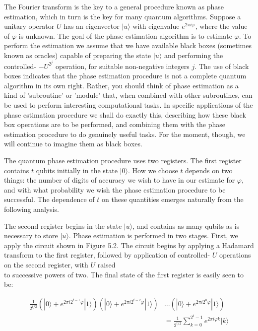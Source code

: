 
The Fourier transform is the key to a general procedure known as phase estimation, which in turn is the key for many quantum algorithms. Suppose a unitary operator $U$ has an eigenvector $|u\rangle$ with eigenvalue $e^{2 \pi i \varphi}$, where the value of $\varphi$ is unknown. The goal of the phase estimation algorithm is to estimate $\varphi$. To perform the estimation we assume that we have available black boxes (sometimes known as oracles) capable of preparing the state $|u\rangle$ and performing the controlled- $-U^{2^{j}}$ operation, for suitable non-negative integers $j$. The use of black boxes indicates that the phase estimation procedure is not a complete quantum algorithm in its own right. Rather, you should think of phase estimation as a kind of 'subroutine' or 'module' that, when combined with other subroutines, can be used to perform interesting computational tasks. In specific applications of the phase estimation procedure we shall do exactly this, describing how these black box operations are to be performed, and combining them with the phase estimation procedure to do genuinely useful tasks. For the moment, though, we will continue to imagine them as black boxes.

The quantum phase estimation procedure uses two registers. The first register contains $t$ qubits initially in the state $|0\rangle$. How we choose $t$ depends on two things: the number of digits of accuracy we wish to have in our estimate for $\varphi$, and with what probability we wish the phase estimation procedure to be successful. The dependence of $t$ on these quantities emerges naturally from the following analysis.

The second register begins in the state $|u\rangle$, and contains as many qubits as is necessary to store $|u\rangle$. Phase estimation is performed in two stages. First, we apply the circuit shown in Figure 5.2. The circuit begins by applying a Hadamard transform to the first register, followed by application of controlled- $U$ operations on the second register, with $U$ raised\\
to successive powers of two. The final state of the first register is easily seen to be:

\begin{align}
\frac{1}{2^{t / 2}}\left(|0\rangle+e^{2 \pi i 2^{t-1} \varphi}|1\rangle\right)\left(|0\rangle+e^{2 \pi i 2^{t-2} \varphi}|1\rangle\right) & \ldots\left(|0\rangle+e^{2 \pi i 2^{0} \varphi}|1\rangle\right) \\
& =\frac{1}{2^{t / 2}} \sum_{k=0}^{2^{t}-1} e^{2 \pi i \varphi k}|k\rangle \tag{5.20}
\end{align} 

